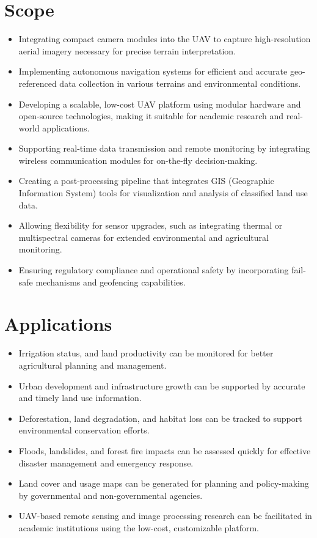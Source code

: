 \section{Scope}
   
\begin{itemize}
    
    \item Integrating compact camera modules into the UAV to capture high-resolution aerial imagery necessary for precise terrain interpretation.
    
    \item Implementing autonomous navigation systems for efficient and accurate geo-referenced data collection in various terrains and environmental conditions.
    \item Developing a scalable, low-cost UAV platform using modular hardware and open-source technologies, making it suitable for academic research and real-world applications.
    \item Supporting real-time data transmission and remote monitoring by integrating wireless communication modules for on-the-fly decision-making.
    \item Creating a post-processing pipeline that integrates GIS (Geographic Information System) tools for visualization and analysis of classified land use data.
    \item Allowing flexibility for sensor upgrades, such as integrating thermal or multispectral cameras for extended environmental and agricultural monitoring.
    \item Ensuring regulatory compliance and operational safety by incorporating fail-safe mechanisms and geofencing capabilities.
\end{itemize}


\section{Applications}


\begin{itemize}
    \item Irrigation status, and land productivity can be monitored for better agricultural planning and management.
    \item Urban development and infrastructure growth can be supported by accurate and timely land use information.
    \item Deforestation, land degradation, and habitat loss can be tracked to support environmental conservation efforts.
    \item Floods, landslides, and forest fire impacts can be assessed quickly for effective disaster management and emergency response.
    \item Land cover and usage maps can be generated for planning and policy-making by governmental and non-governmental agencies.
    \item UAV-based remote sensing and image processing research can be facilitated in academic institutions using the low-cost, customizable platform.
\end{itemize}
